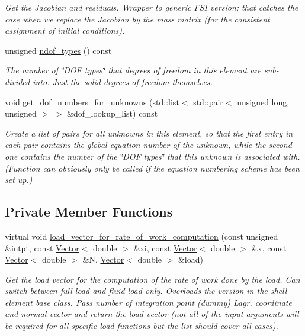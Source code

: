 \begin{DoxyCompactItemize}
\begin{DoxyCompactList}\small\item\em Get the Jacobian and residuals. Wrapper to generic F\+SI version; that catches the case when we replace the Jacobian by the mass matrix (for the consistent assignment of initial conditions). \end{DoxyCompactList}\item 
unsigned \hyperlink{classoomph_1_1FSIDiagHermiteShellElement_aa190107f807910bf4e9d5a7e333d97a2}{ndof\+\_\+types} () const
\begin{DoxyCompactList}\small\item\em The number of \char`\"{}\+D\+O\+F types\char`\"{} that degrees of freedom in this element are sub-\/divided into\+: Just the solid degrees of freedom themselves. \end{DoxyCompactList}\item 
void \hyperlink{classoomph_1_1FSIDiagHermiteShellElement_a41c37ca0ac22147cc0b16dea14b70418}{get\+\_\+dof\+\_\+numbers\+\_\+for\+\_\+unknowns} (std\+::list$<$ std\+::pair$<$ unsigned long, unsigned $>$ $>$ \&dof\+\_\+lookup\+\_\+list) const
\begin{DoxyCompactList}\small\item\em Create a list of pairs for all unknowns in this element, so that the first entry in each pair contains the global equation number of the unknown, while the second one contains the number of the \char`\"{}\+D\+O\+F types\char`\"{} that this unknown is associated with. (Function can obviously only be called if the equation numbering scheme has been set up.) \end{DoxyCompactList}\end{DoxyCompactItemize}
\subsection*{Private Member Functions}
\begin{DoxyCompactItemize}
\item 
virtual void \hyperlink{classoomph_1_1FSIDiagHermiteShellElement_ad57fbbe43b255ff6429c43366fb5d64a}{load\+\_\+vector\+\_\+for\+\_\+rate\+\_\+of\+\_\+work\+\_\+computation} (const unsigned \&intpt, const \hyperlink{classoomph_1_1Vector}{Vector}$<$ double $>$ \&xi, const \hyperlink{classoomph_1_1Vector}{Vector}$<$ double $>$ \&x, const \hyperlink{classoomph_1_1Vector}{Vector}$<$ double $>$ \&N, \hyperlink{classoomph_1_1Vector}{Vector}$<$ double $>$ \&load)
\begin{DoxyCompactList}\small\item\em Get the load vector for the computation of the rate of work done by the load. Can switch between full load and fluid load only. Overloads the version in the shell element base class. Pass number of integration point (dummy) Lagr. coordinate and normal vector and return the load vector (not all of the input arguments will be required for all specific load functions but the list should cover all cases). \end{DoxyCompactList}\end{DoxyCompactItemize}
